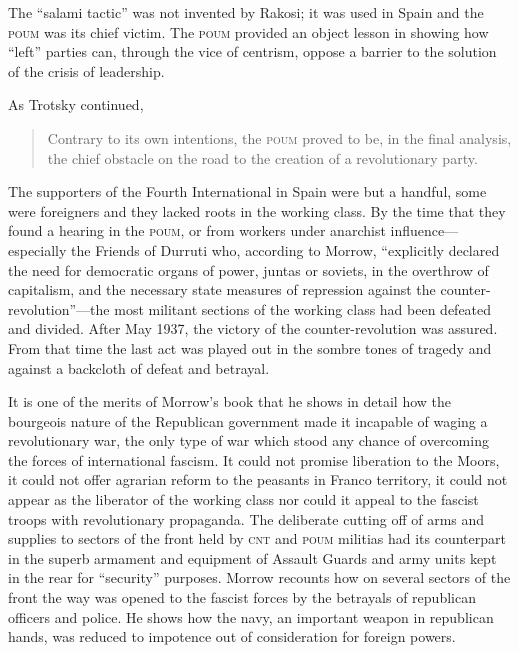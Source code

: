 The ``salami tactic'' was not invented by Rakosi; it was used in Spain and the \textsc{poum} was its chief victim. The \textsc{poum} provided an object lesson in showing how ``left'' parties can, through the vice of centrism, oppose a barrier to the solution of the crisis of leadership.

As Trotsky continued,

\begin{quotation}
  Contrary to its own intentions, the \textsc{poum} proved to be, in the final analysis, the chief obstacle on the road to the creation of a revolutionary party.
\end{quotation}

The supporters of the Fourth International in Spain were but a handful, some were foreigners and they lacked roots in the working class. By the time that they found a hearing in the \textsc{poum}, or from workers under anarchist influence---especially the Friends of Durruti who, according to Morrow, ``explicitly declared the need for democratic organs of power, juntas or soviets, in the overthrow of capitalism, and the necessary state measures of repression against the counter-revolution''---the most militant sections of the working class had been defeated and divided. After May 1937, the victory of the counter-revolution was assured. From that time the last act was played out in the sombre tones of tragedy and against a backcloth of defeat and betrayal.

\dinkus

It is one of the merits of Morrow’s book that he shows in detail how the bourgeois nature of the Republican government made it incapable of waging a revolutionary war, the only type of war which stood any chance of overcoming the forces of international fascism. It could not promise liberation to the Moors, it could not offer agrarian reform to the peasants in Franco territory, it could not appear as the liberator of the working class nor could it appeal to the fascist troops with revolutionary propaganda. The deliberate cutting off of arms and supplies to sectors of the front held by \textsc{cnt} and \textsc{poum} militias had its counterpart in the superb armament and equipment of Assault Guards and army units kept in the rear for ``security'' purposes. Morrow recounts how on several sectors of the front the way was opened to the fascist forces by the betrayals of republican officers and police. He shows how the navy, an important weapon in republican hands, was reduced to impotence out of consideration for foreign powers.

